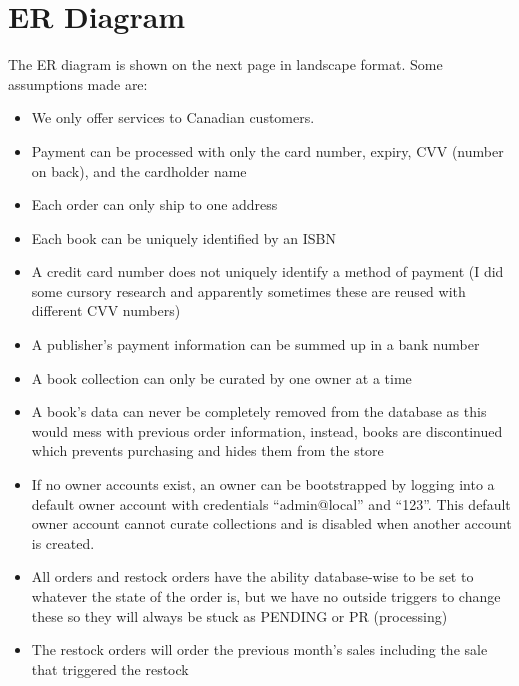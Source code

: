 \documentclass{article}
\begin{document}
\section{ER Diagram}
The ER diagram is shown on the next page in landscape format.
Some assumptions made are:
\begin{itemize}
  \item We only offer services to Canadian customers.
  \item Payment can be processed with only the card number, expiry, CVV (number on back), and the cardholder name
  \item Each order can only ship to one address
  \item Each book can be uniquely identified by an ISBN
  \item A credit card number does not uniquely identify a method of payment (I did some cursory research and apparently sometimes these are reused with different CVV numbers)
  \item A publisher's payment information can be summed up in a bank number
  \item A book collection can only be curated by one owner at a time
  \item A book's data can never be completely removed from the database as this would mess with previous order information, instead, books are discontinued which prevents purchasing and hides them from the store
  \item If no owner accounts exist, an owner can be bootstrapped by logging into a default owner account with credentials ``admin@local'' and ``123''. This default owner account cannot curate collections and is disabled when another account is created.
  \item All orders and restock orders have the ability database-wise to be set to whatever the state of the order is, but we have no outside triggers to change these so they will always be stuck as PENDING or PR (processing)
  \item The restock orders will order the previous month's sales including the sale that triggered the restock
\end{itemize}
\end{document}
